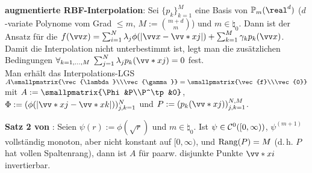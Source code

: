 \linie

\textbf{augmentierte RBF-Interpolation}:
Sei $\{p_k\}_{k=1}^M$ eine Basis von $\PP_m(\real^d)$
($d$-variate Polynome vom Grad $\le m$, $M := \binom{m+d}{m}$) und $m \in \natural_0$.
Dann ist der Ansatz für die 
$f(\vec{x}) = \sum_{i=1}^N \lambda_j \phi(|\vec{x} - \vecs{x}{j}|) +
\sum_{k=1}^M \gamma_k p_k(\vec{x})$.
Damit die Interpolation nicht unterbestimmt ist, legt man die
zusätzlichen Bedingungen $\forall_{k=1,\dotsc,M}\; \sum_{j=1}^N \lambda_j p_k(\vecs{x}{j}) = 0$
fest.\\
Man erhält das Interpolations-LGS
$A\smallpmatrix{\vec{\lambda}\\\vec{\gamma}} = \smallpmatrix{\vec{f}\\\vec{0}}$ mit
$A := \smallpmatrix{\Phi&P\\P^\tp&0}$, $\Phi := (\phi(|\vecs{x}{j} - \vecs{x}{k}|))_{j,k=1}^N$ und
$P := (p_k(\vecs{x}{j}))_{j,k=1}^{N,M}$.

\textbf{Satz 2 von }:
Seien $\psi(r) := \phi(\sqrt{r})$ und $m \in \natural_0$.
Ist $\psi \in \mathcal{C}^0([0, \infty))$,
$\psi^{(m+1)}$ vollständig monoton, aber nicht konstant auf $[0, \infty)$, und
$\text{Rang}(P) = M$ (d.\,h. $P$ hat vollen Spaltenrang),
dann ist $A$ für paarw. disjunkte Punkte $\vecs{x}{i}$ invertierbar.

\pagebreak

